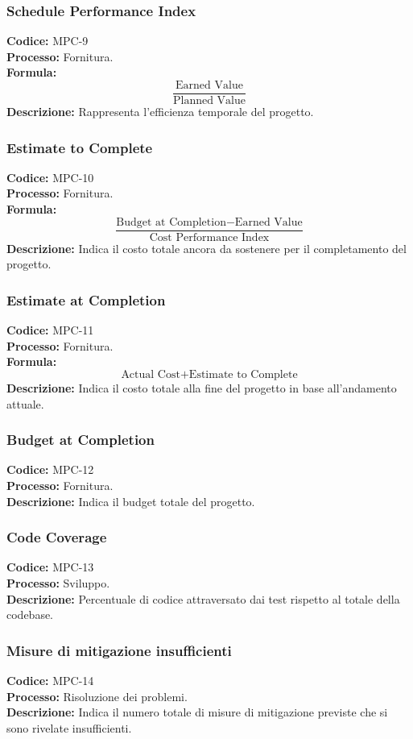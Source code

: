 \subsubsection{Schedule Performance Index}
\textbf{Codice:} MPC-9 \\
\textbf{Processo:} Fornitura. \\
\textbf{Formula:}
\[
\frac{\text{Earned Value}}{\text{Planned Value}}
\]
\textbf{Descrizione:} Rappresenta l’efficienza temporale del progetto.

\subsubsection{Estimate to Complete}
\textbf{Codice:} MPC-10 \\
\textbf{Processo:} Fornitura. \\
\textbf{Formula:}
\[
\frac{\text{Budget at Completion} - \text{Earned Value}}{\text{Cost Performance Index}}
\]
\textbf{Descrizione:} Indica il costo totale ancora da sostenere per il completamento del progetto.

\subsubsection{Estimate at Completion}
\textbf{Codice:} MPC-11 \\
\textbf{Processo:} Fornitura. \\
\textbf{Formula:}
\[
\text{Actual Cost} + \text{Estimate to Complete}
\]
\textbf{Descrizione:} Indica il costo totale alla fine del progetto in base all’andamento attuale.

\subsubsection{Budget at Completion}
\textbf{Codice:} MPC-12 \\
\textbf{Processo:} Fornitura. \\
\textbf{Descrizione:} Indica il budget totale del progetto.

\subsubsection{Code Coverage}
\textbf{Codice:} MPC-13 \\
\textbf{Processo:} Sviluppo. \\
\textbf{Descrizione:} Percentuale di codice attraversato dai test rispetto al totale della codebase.

\subsubsection{Misure di mitigazione insufficienti}
\textbf{Codice:} MPC-14 \\
\textbf{Processo:} Risoluzione dei problemi. \\
\textbf{Descrizione:} Indica il numero totale di misure di mitigazione previste che si sono rivelate insufficienti.

